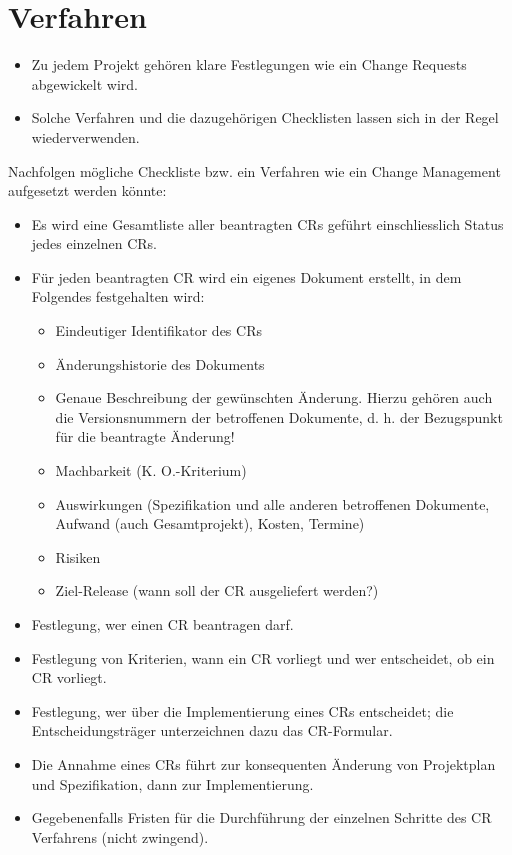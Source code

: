 \section{Verfahren}
\label{sec:change_mgmt_verfahren}

\begin{itemize}
	\item Zu jedem Projekt gehören klare Festlegungen wie ein Change Requests abgewickelt wird.
	\item Solche Verfahren und die dazugehörigen Checklisten lassen sich in der Regel wiederverwenden.
\end{itemize}

Nachfolgen mögliche Checkliste bzw. ein Verfahren wie ein Change Management aufgesetzt werden könnte:
\begin{itemize}
	\item Es wird eine Gesamtliste aller beantragten CRs geführt einschliesslich Status jedes einzelnen CRs.
	\item Für jeden beantragten CR wird ein eigenes Dokument erstellt, in dem Folgendes festgehalten wird:
	\begin{itemize}
		\item Eindeutiger Identifikator des CRs
		\item Änderungshistorie des Dokuments
		\item Genaue Beschreibung der gewünschten Änderung. Hierzu gehören
		auch die Versionsnummern der betroffenen Dokumente, d. h. der
		Bezugspunkt für die beantragte Änderung!
		\item Machbarkeit (K. O.-Kriterium)
		\item Auswirkungen (Spezifikation und alle anderen betroffenen Dokumente, Aufwand (auch Gesamtprojekt), Kosten, Termine)
		\item Risiken
		\item Ziel-Release (wann soll der CR ausgeliefert werden?)
	\end{itemize}
	\item Festlegung, wer einen CR beantragen darf.
	\item Festlegung von Kriterien, wann ein CR vorliegt und wer entscheidet, ob ein CR vorliegt.
	\item Festlegung, wer über die Implementierung eines CRs entscheidet; die	Entscheidungsträger unterzeichnen dazu das CR-Formular.
	\item Die Annahme eines CRs führt zur konsequenten Änderung von Projektplan und Spezifikation, dann zur Implementierung.
	\item Gegebenenfalls Fristen für die Durchführung der einzelnen Schritte des CR Verfahrens (nicht zwingend).
\end{itemize}

